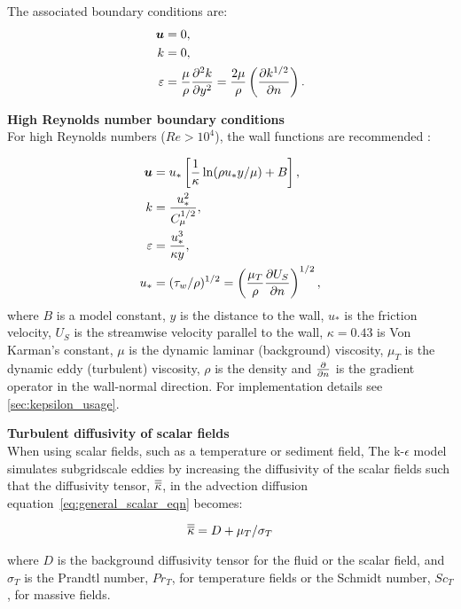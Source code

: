 The associated boundary conditions are:
\begin{align}
  \bmu &= 0, \label{eq:ubc1}\\
  k &= 0, \label{eq:kbc1}\\
  \epsilon &= \frac{\mu}{\rho} \ppxx[y]{k} = \frac{2\mu}{\rho} \left ( \ppx[n]{k^{1/2}}
  \right ). \label{eq:epsbc1}
\end{align}

\par{\textbf{High Reynolds number boundary conditions}\\}
For high Reynolds numbers ($Re>10^4$), the  wall functions are
recommended \citep{wilcox1998turbulence}:

\begin{align}
  \bmu &= u_* \left [ \frac{1}{\kappa} \ln (\rho u_* y / \mu) + B \right ], \label{eq:ubc2}\\
  k &= \frac{u_*^2}{C_{\mu}^{1/2}}, \label{eq:kbc2}\\
  \epsilon &= \frac{u_*^3}{\kappa y}, \label{eq:epsbc2}\\
  u_* &= (\tau_w / \rho)^{1/2} = \left ( \frac{\mu_T}{\rho} \ppx[n]{U_S} \right
  )^{1/2}, \label{eq:ustar}
\end{align}
where $B$ is a model constant, $y$ is the distance to the wall, $u_*$ is the friction
velocity, $U_S$ is the streamwise velocity parallel to the wall, $\kappa=0.43$ is Von
Karman's constant, $\mu$ is the dynamic laminar (background) viscosity, $\mu_T$ is the
dynamic eddy (turbulent) viscosity, $\rho$ is the density and $\ppx[n]{}$ is the gradient
operator in the wall-normal direction. For implementation details see
\ref{sec:kepsilon_usage}.

\par{\textbf{Turbulent diffusivity of scalar fields}\\}
When using scalar fields, such as a temperature or sediment field, The k-$\epsilon$ model
simulates subgridscale eddies by increasing the diffusivity of the scalar fields such that
the diffusivity tensor, $\kaptens$, in the advection diffusion
equation~\ref{eq:general_scalar_eqn} becomes:

\begin{equation}\label{eq:keps_diff}
  \kaptens = D + \mu_T/\sigma_T
\end{equation}

where $D$ is the background diffusivity tensor for the fluid or the scalar field, and
$\sigma_T$ is the Prandtl number, $Pr_T$, for temperature fields or the Schmidt number,
$Sc_T$, for massive fields.

